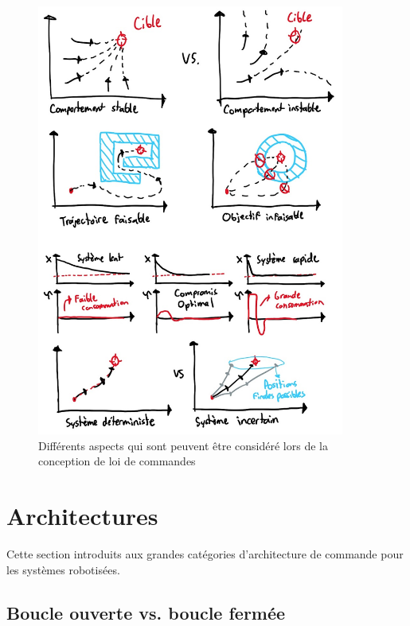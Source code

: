 \begin{figure}[htbp]
	\centering
		\includegraphics[width=0.9\textwidth]{fig/controlgoal.jpg}
	\caption{Différents aspects qui sont peuvent être considéré lors de la conception de loi de commandes}
	\label{fig:controlgoal}
\end{figure}


\section{Architectures}

Cette section introduits aux grandes catégories d'architecture de commande pour les systèmes robotisées. 


\subsection{Boucle ouverte vs. boucle fermée}

